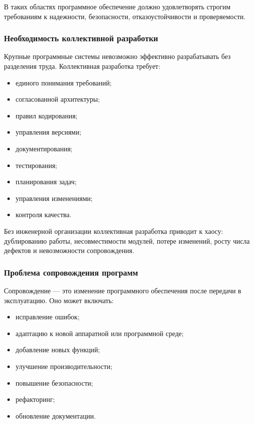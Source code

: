 \documentclass[12pt,a4paper]{article}
\begin{document}
В таких областях программное обеспечение должно удовлетворять строгим требованиям к надежности, безопасности, отказоустойчивости и проверяемости.

\subsubsection{Необходимость коллективной разработки}

Крупные программные системы невозможно эффективно разрабатывать без разделения труда. Коллективная разработка требует:

\begin{itemize}
    \item единого понимания требований;
    \item согласованной архитектуры;
    \item правил кодирования;
    \item управления версиями;
    \item документирования;
    \item тестирования;
    \item планирования задач;
    \item управления изменениями;
    \item контроля качества.
\end{itemize}

Без инженерной организации коллективная разработка приводит к хаосу: дублированию работы, несовместимости модулей, потере изменений, росту числа дефектов и невозможности сопровождения.

\subsubsection{Проблема сопровождения программ}

Сопровождение --- это изменение программного обеспечения после передачи в эксплуатацию. Оно может включать:

\begin{itemize}
    \item исправление ошибок;
    \item адаптацию к новой аппаратной или программной среде;
    \item добавление новых функций;
    \item улучшение производительности;
    \item повышение безопасности;
    \item рефакторинг;
    \item обновление документации.
\end{itemize}
\end{document}
